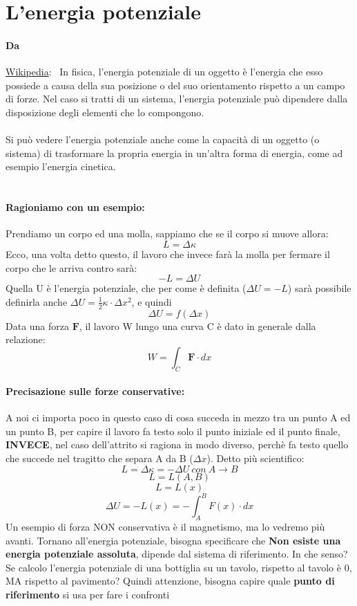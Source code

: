 \documentclass[12pt, a4paper, openany, oneside]{book}
\begin{document}
\section{L'energia potenziale}
\paragraph{Da} \href{https://www.wikiwand.com/it/Energia_potenziale}{Wikipedia}:
~In fisica, l'energia potenziale di un oggetto è l'energia che esso possiede a 
causa della sua posizione o del suo orientamento rispetto a un campo di forze.
Nel caso si tratti di un sistema, l'energia potenziale può dipendere dalla 
disposizione degli elementi che lo compongono.\\ \\ Si può vedere l'energia 
potenziale anche come la capacità di un oggetto (o sistema) di trasformare la 
propria energia in un'altra forma di energia, come ad esempio l'energia cinetica. 
\\ \\
\paragraph{Ragioniamo con un esempio: }
Prendiamo un corpo ed una molla, sappiamo che se il corpo si muove allora:
\[
L = \Delta \kappa
\]
Ecco, una volta detto questo, il lavoro che invece farà la molla per fermare 
il corpo che le arriva contro sarà:
\[
-L = \Delta U
\]
Quella U è l'energia potenziale, che per come è definita ($\Delta U = -L$) sarà
possibile definirla anche $\Delta U = \frac{1}{2}\kappa \cdot \Delta x^{2}$,
e quindi
\[
\Delta U = f(\Delta x)
\]
Data una forza $\mathbf{F}$, il lavoro W lungo una curva C è dato in generale
dalla relazione: 
\[
W = \int_{C} \mathbf{F}\cdot dx
\]
\paragraph{Precisazione sulle forze conservative: } A noi ci importa poco 
in questo caso di cosa succeda in mezzo tra un punto A ed un punto B, per capire
il lavoro fa testo solo il punto iniziale ed il punto finale, \textbf{INVECE},
nel caso dell'attrito si ragiona in modo diverso, perchè fa testo quello che
succede nel tragitto che separa A da B ($\Delta x$). Detto più scientifico:
\[L = \Delta\kappa = -\Delta U ~ con ~ A\to B \]
\[L = L(A,B) \]
\[L = L(x) \]
\[\Delta U = -L(x) = - \int_{A}^{B}  F(x)\cdot dx\]
Un esempio di forza NON conservativa è il magnetismo, ma lo vedremo più avanti.
Tornano all'energia potenziale, bisogna specificare che \textbf{Non esiste 
una energia potenziale assoluta}, dipende dal sistema di riferimento. In che senso?
Se calcolo l'energia potenziale di una bottiglia su un tavolo, rispetto al tavolo
è 0, MA rispetto al pavimento? Quindi attenzione, bisogna capire quale \textbf{punto
di riferimento} si usa per fare i confronti
\end{document}
